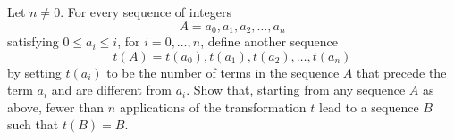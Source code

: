 Let $n \neq 0$. For every sequence of integers \[ A = a_0,a_1,a_2,\dots, a_n \] satisfying $0 \le a_i \le i$,  for $i=0,\dots,n$,  define another sequence \[ t(A)= t(a_0), t(a_1), t(a_2), \dots, t(a_n) \] by setting $t(a_i)$ to be the number of terms in the sequence $A$ that precede the term $a_i$ and are different from $a_i$. Show that, starting from any sequence $A$ as above, fewer than $n$ applications of the  transformation $t$ lead to a sequence $B$ such that $t(B) = B$.